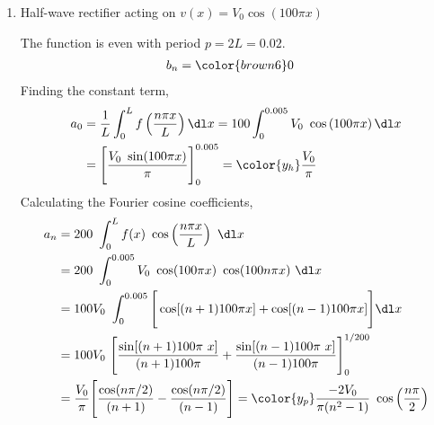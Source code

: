 \begin{enumerate}
    \item Half-wave rectifier acting on $ v(x) = V_0\cos(100 \pi x) $
          \begin{figure}[H]
              \centering
          \end{figure}
          The function is even with period $ p = 2L = 0.02 $.
          \begin{align}
              b_n & = \color{brown6} 0
          \end{align}
          Finding the constant term,
          \begin{align}
              a_0 & = \frac{1}{L} \int_{0}^{L} f\left( \frac{n\pi x}{L} \right) \dl x
              = 100 \int_{0}^{0.005} V_0\ \cos\left( 100\pi x \right) \dl x           \\
                  & = \Bigg[ \frac{V_0\ \sin(100\pi x)}{\pi} \Bigg]_{0}^{0.005}
              = \color{y_h} \frac{V_0}{\pi}
          \end{align}
          Calculating the Fourier cosine coefficients,
          \begin{align}
              a_n & = 200\ \int_{0}^{L} f(x)\ \cos\left( \frac{n\pi x}{L} \right)
              \ \dl x                                                             \\
                  & = 200\ \int_{0}^{0.005} V_0\ \cos(100\pi x)\ \cos(100n\pi x)
              \ \dl x                                                             \\
                  & = 100V_0\ \int_{0}^{0.005} \Bigg[ \cos[(n+1)100\pi x]
              + \cos[(n-1)100\pi x] \Bigg] \dl x                                  \\
                  & = 100V_0\ \Bigg[ \frac{\sin[(n+1)100\pi\ x]}{(n+1)100\pi}
              + \frac{\sin[(n-1)100\pi\ x]}{(n-1)100\pi}  \Bigg]_{0}^{1/200}      \\
                  & = \frac{V_0}{\pi} \Bigg[ \frac{\cos(n\pi/2)}{(n+1)}
                  - \frac{\cos(n\pi/2)}{(n-1)} \Bigg]
              = \color{y_p} \frac{-2V_0}{\pi (n^2 - 1)}\ \cos\left(
              \frac{n\pi}{2} \right)
          \end{align}


\end{enumerate}
